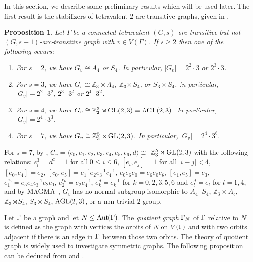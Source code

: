 \documentclass[12pt]{article}
\newtheorem{prop}[lem]{Proposition}%
\def\f{\noindent}
\def\Aut{\hbox{\rm Aut}}
\def\mz{{\mathbb Z}}
\begin{document}
In this section, we describe some preliminary results which will be used later. The first result is the stabilizers of tetravalent $2$-arc-transitive graphs, given in \cite[Theorem 4]{Potocnik}.

\begin{prop}\label{prop=stabilizer}
Let $\Gamma$ be a connected tetravalent $(G,s)$-arc-transitive but not   $(G,s+1)$-arc-transitive graph with $v\in V(\Gamma)$. If $s\geq 2$ then one of the following occurs:
\begin{enumerate}

\itemsep -1pt
\item [\rm (1)] For $s=2$, we have $G_v\cong A_4$ or $S_4$. In particular, $|G_v|=2^2\cdot 3$ or $2^3\cdot 3$.
\item [\rm (2)] For $s=3$, we have $G_v\cong \mz_3 \times A_4$, $\mz_3\rtimes S_4$, or $S_3 \times S_4$. In particular, $|G_v|=2^2\cdot 3^2$, $2^3\cdot 3^2$ or $2^4\cdot 3^2$.
\item [\rm (3)] For $s=4$, we have $G_v\cong\mz_2^3\rtimes \rm GL(2,3)= \rm AGL(2,3)$. In particular, $|G_v|=2^4\cdot 3^3$.
\item [\rm (4)] For $s=7$, we have $G_v\cong \mz_3^5 \rtimes \GL(2,3)$. In particular, $|G_v|=2^4\cdot 3^6$.
\end{enumerate}
\end{prop}

\f {\bf Remark:} For $s=7$, by \cite[Theorem 1.1]{Potocnik}, $G_v=\langle e_0,e_1,e_2,e_3,e_4,e_5,e_6,d \rangle\cong$
$\mz_3^5\rtimes\rm GL(2,3)$ with the following relations: $e_i^3=d^2=1$ for all $0\leq i\leq 6$, $[e_i,e_j]=1$ for
all $|i-j|<4$, $[e_0,e_4]=e_2$, $[e_0,e_5]=e_1^{-1}e_2e_3^{-1}e_4^{-1}$, $e_0e_6e_0=e_6e_0e_6$, $[e_1,e_5]=e_3$,
$e_1^{e_6}=e_5e_4e_3^{-1}e_2e_1$, $e_2^{e_6}=e_2e_4^{-1}$, $e_k^d=e_k^{-1}$
for $k=0,2,3,5,6$ and $e_l^d=e_l$ for $l=1,4$, and by MAGMA~\cite{magma}, $G_v$ has no normal subgroup isomorphic to $A_4$, $S_4$, $\mz_3\times A_4$, $\mz_3\rtimes S_4$, $S_3\times S_4$, $\rm AGL(2,3)$, or a non-trivial $2$-group.

\medskip

Let $\Gamma$ be a graph and let $N \leq \Aut(\G)$. The \emph{quotient graph} $\Gamma_N$
of $\Gamma$ relative to $N$ is defined as the graph with vertices
the orbits of $N$ on $V(\Gamma)$ and with two orbits adjacent if there is an edge
in $\Gamma$ between those two orbits. The theory of quotient graph is widely used
to investigate symmetric graphs. The following proposition can be deduced from  \cite[Theorem 1.1]{Gardiner} and \cite[Theorem 4.1]{Praeger}.
\end{document}
